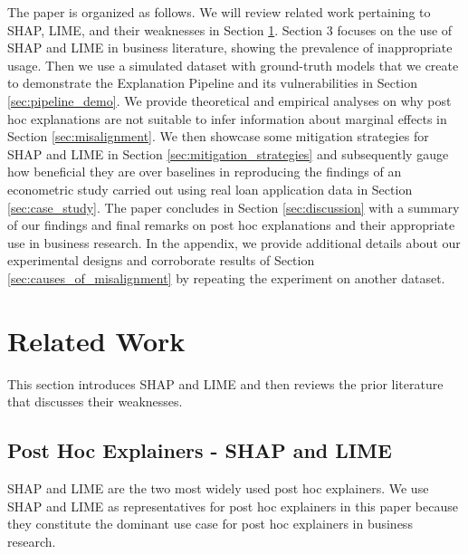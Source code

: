 \documentclass[12pt]{article}  %
\begin{document}
    The paper is organized as follows. We will review related work pertaining to SHAP, LIME, and their weaknesses in Section \ref{sec:related_work}. Section 3 focuses on the use of SHAP and LIME in business literature, showing the prevalence of inappropriate usage. Then we use a simulated dataset with ground-truth models that we create to demonstrate the Explanation Pipeline and its vulnerabilities in Section \ref{sec:pipeline_demo}.  We provide theoretical and empirical analyses on why post hoc explanations are not suitable to infer information about marginal effects in Section \ref{sec:misalignment}. %
    We then showcase some mitigation strategies for SHAP and LIME in Section \ref{sec:mitigation_strategies} and subsequently gauge how beneficial they are over baselines in reproducing the findings of an econometric study carried out using real loan application data in Section \ref{sec:case_study}. The paper concludes in Section \ref{sec:discussion} with a summary of our findings and final remarks on post hoc explanations and their appropriate use in business research. In the appendix, we provide additional details about our experimental designs and  corroborate results of Section \ref{sec:causes_of_misalignment} by repeating the experiment on another dataset.
    
\section{Related Work}
    \label{sec:related_work}
    This section introduces SHAP and LIME and then reviews the prior literature that discusses their weaknesses. %

    \subsection{Post Hoc Explainers - SHAP and LIME}
     SHAP \citep{lundberg17shap} and LIME \citep{ribeiro16lime}  are the two most widely used post hoc explainers. %
        We use SHAP and LIME as representatives for post hoc explainers in this paper because they constitute the dominant use case for post hoc explainers in business research.
\end{document}
